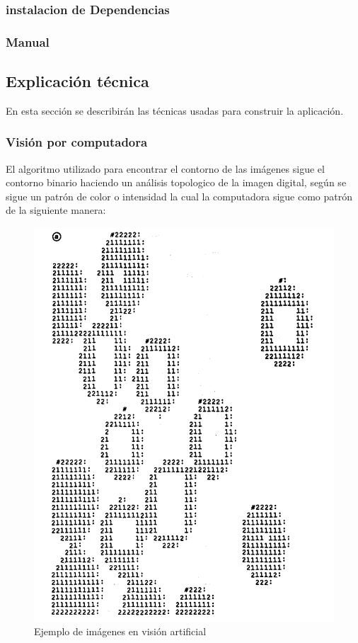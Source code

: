 \documentclass{article}
\begin{document}
\subsubsection{instalacion de Dependencias}
\subsubsection{Manual}
\subsection{Explicación técnica}
En esta secci\'on se describir\'an las t\'ecnicas usadas para construir la aplicaci\'on.
\subsubsection{Visi\'on por computadora}
El algoritmo utilizado para encontrar el contorno de las im\'agenes sigue el contorno binario haciendo
un an\'alisis topologico de la imagen digital, según \cite{test} se sigue un patr\'on de color o intensidad
la cual la computadora sigue como patr\'on de la siguiente manera:
\begin{figure}[H]
\caption{Ejemplo de im\'agenes en visi\'on artificial}
\centering
\includegraphics[scale=.15]{a}
\end{figure}
\end{document}
